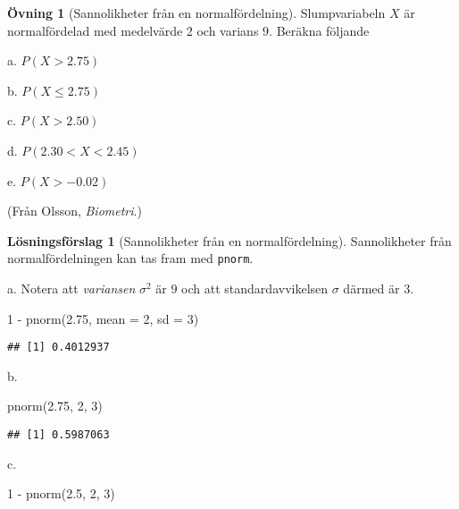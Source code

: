 \documentclass[
]{book}
\newenvironment{Shaded}{\begin{snugshade}}{\end{snugshade}}
\newcommand{\AttributeTok}[1]{\textcolor[rgb]{0.77,0.63,0.00}{#1}}
\newcommand{\DecValTok}[1]{\textcolor[rgb]{0.00,0.00,0.81}{#1}}
\newcommand{\FloatTok}[1]{\textcolor[rgb]{0.00,0.00,0.81}{#1}}
\newcommand{\FunctionTok}[1]{\textcolor[rgb]{0.00,0.00,0.00}{#1}}
\newcommand{\NormalTok}[1]{#1}
\newcommand{\SpecialCharTok}[1]{\textcolor[rgb]{0.00,0.00,0.00}{#1}}
\theoremstyle{definition}
\theoremstyle{definition}
\theoremstyle{definition}
\newtheorem{exercise}{Övning}[chapter]
\theoremstyle{definition}
\newtheorem{hypothesis}{Lösningsförslag}[chapter]
\theoremstyle{remark}
\begin{document}
\begin{exercise}[Sannolikheter från en normalfördelning]
Slumpvariabeln \(X\) är normalfördelad med medelvärde \(2\) och varians \(9\). Beräkna följande

a. \(P(X > 2.75)\)

b. \(P(X \leq 2.75)\)

c. \(P(X > 2.50)\)

d. \(P(2.30 < X < 2.45)\)

e. \(P(X > -0.02)\)

(Från Olsson, \emph{Biometri}.)
\end{exercise}

\begin{hypothesis}[Sannolikheter från en normalfördelning]
Sannolikheter från normalfördelningen kan tas fram med \texttt{pnorm}.

a. Notera att \emph{variansen} \(\sigma^2\) är \(9\) och att standardavvikelsen \(\sigma\) därmed är \(3\).

\begin{Shaded}
\begin{Highlighting}[]
\DecValTok{1} \SpecialCharTok{{-}} \FunctionTok{pnorm}\NormalTok{(}\FloatTok{2.75}\NormalTok{, }\AttributeTok{mean =} \DecValTok{2}\NormalTok{, }\AttributeTok{sd =} \DecValTok{3}\NormalTok{)}
\end{Highlighting}
\end{Shaded}

\begin{verbatim}
## [1] 0.4012937
\end{verbatim}

b.

\begin{Shaded}
\begin{Highlighting}[]
\FunctionTok{pnorm}\NormalTok{(}\FloatTok{2.75}\NormalTok{, }\DecValTok{2}\NormalTok{, }\DecValTok{3}\NormalTok{)}
\end{Highlighting}
\end{Shaded}

\begin{verbatim}
## [1] 0.5987063
\end{verbatim}

c.

\begin{Shaded}
\begin{Highlighting}[]
\DecValTok{1} \SpecialCharTok{{-}} \FunctionTok{pnorm}\NormalTok{(}\FloatTok{2.5}\NormalTok{, }\DecValTok{2}\NormalTok{, }\DecValTok{3}\NormalTok{)}
\end{Highlighting}
\end{Shaded}


\end{hypothesis}
\end{document}
